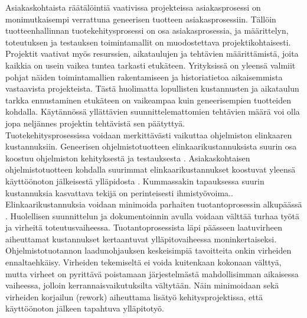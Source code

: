 \documentclass[finnish,12pt,a4paper,pdftex]{article}
\begin{document}
\noindent Asiakaskohtaista räätälöintiä vaativissa projekteissa asiakasprosessi on monimutkaisempi verrattuna geneerisen tuotteen asiakasprosessiin. Tällöin tuotteenhallinnan tuotekehitysprosessi on osa asiakasprosessia, ja määrittelyn, toteutuksen ja testauksen toimintamallit on muodostettava projektikohtaisesti. Projektit vaativat myös resurssien, aikataulujen ja tehtävien määrittämistä, joita kaikkia on usein vaikea tuntea tarkasti etukäteen. Yrityksissä on yleensä valmiit pohjat näiden toimintamallien rakentamiseen ja historiatietoa aikaisemmista vastaavista projekteista. Tästä huolimatta lopullisten kustannusten ja aikataulun tarkka ennustaminen etukäteen on vaikeampaa kuin geneerisempien tuotteiden kohdalla. Käytännössä yllättävien suunnittelemattomien tehtävien määrä voi olla jopa neljännes projektin tehtävistä sen päätyttyä. \citep{ohjelmistotuotanto}\\

\noindent Tuotekehitysprosessissa voidaan merkittävästi vaikuttaa ohjelmiston elinkaaren kustannuksiin. Geneerisen ohjelmistotuotteen elinkaarikustannuksista suurin osa koostuu ohjelmiston kehityksestä ja testauksesta \citep{sommerville}. Asiakaskohtaisen ohjelmistotuotteen kohdalla suurimmat elinkaarikustannukset koostuvat yleensä käyttöönoton jälkeisestä ylläpidosta \citep{sommerville, ohjelmistotuotanto}. Kummassakin tapauksessa suurin kustannuksia kasvattava tekijä on perinteisesti ihmistyövoima.\citep{ohjelmistotuotanto}. \\

\noindent Elinkaarikustannuksia voidaan minimoida parhaiten tuotantoprosessin alkupäässä \citep{ohjelmistotuotanto}. Huolellisen suunnittelun ja dokumentoinnin avulla voidaan välttää turhaa työtä ja virheitä toteutusvaiheessa. Tuotantoprosessista läpi päässeen laatuvirheen aiheuttamat kustannukset kertaantuvat ylläpitovaiheessa moninkertaiseksi. Ohjelmistotuotannon laadunohjauksen keskeisimpiä tavoitteita onkin virheiden ennaltaehkäisy. Virheiden tekemiseltä ei voida kuitenkaan kokonaan välttyä, mutta virheet on pyrittävä poistamaan järjestelmästä mahdollisimman aikaisessa vaiheessa, jolloin kerrannaisvaikutuksilta vältytään. Näin minimoidaan sekä virheiden korjailun (rework) aiheuttama lisätyö kehitysprojektissa, että käyttöönoton jälkeen tapahtuva ylläpitotyö. \citep{okaytannot}

\end{document}
